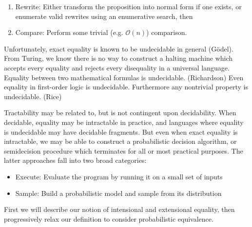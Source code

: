 \documentclass[11pt]{article}
\begin{document}
    \begin{enumerate}
        \item Rewrite: Either transform the proposition into normal form if one exists, or enumerate valid rewrites using an enumerative search, then
        \item Compare: Perform some trivial (e.g. $\mathcal{O}(n)$) comparison.
    \end{enumerate}

    Unfortunately, exact equality is known to be undecidable in general (G\"odel). From Turing, we know there is no way to construct a halting machine which accepts every equality and rejects every disequality in a universal language. Equality between two mathematical formulas is undecidable. (Richardson) Even equality in first-order logic is undecidable. Furthermore any nontrivial property is undecidable. (Rice)


    Tractability may be related to, but is not contingent upon decidability. When decidable, equality may be intractable in practice, and languages where equality is undecidable may have decidable fragments. But even when exact equality is intractable, we may be able to construct a probabilistic decision algorithm, or semidecision procedure which terminates for all or most practical purposes. The latter approaches fall into two broad categories:

    \begin{itemize}
        \item Execute: Evaluate the program by running it on a small set of inputs
        \item Sample: Build a probabilistic model and sample from its distribution
    \end{itemize}

    First we will describe our notion of intensional and extensional equality, then progressively relax our definition to consider probabilistic equivalence.


%
\end{document}
